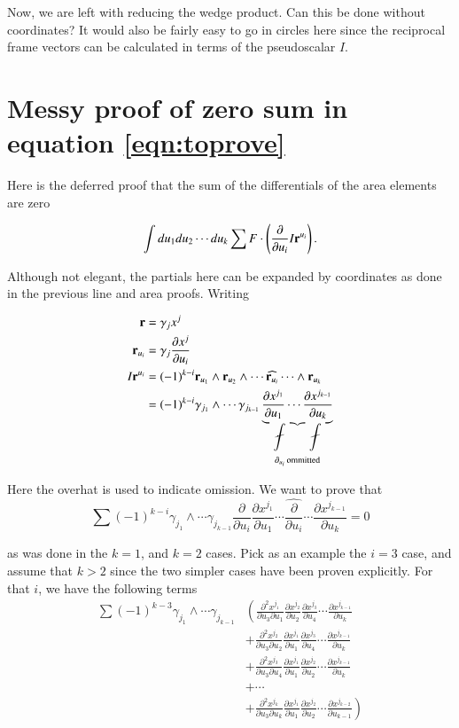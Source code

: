 \documentclass{article}
\newcommand{\PD}[2]{\frac{\partial {#2}}{\partial {#1}}}
\newcommand{\PDD}[3]{\frac{\partial^2 {#3}}{\partial {#1}\partial {#2}}}
\begin{document}
Now, we are left with reducing the wedge product.  Can this be done without coordinates?  It would also be fairly easy to go in circles here since the reciprocal frame vectors can be calculated in terms of the pseudoscalar $I$.

\section{ Messy proof of zero sum in equation \ref{eqn:toprove} }

Here is the deferred proof that the sum of the differentials of the area elements are zero

\begin{align*}
\int du_1 du_2 \cdots du_k \sum F \cdot \left( \PD{u_i}{} I \Br^{u_i} \right).
\end{align*}

Although not elegant, the partials here can be expanded by coordinates as done in the previous line and area proofs.
Writing

\begin{align*}
\Br &= \gamma_j x^j \\
\Br_{u_i} &= \gamma_j \PD{u_i}{x^j} \\
I \Br^{u_i}
&= (-1)^{k-i} \Br_{u_1} \wedge \Br_{u_2} \wedge \cdots \widehat{\Br_{u_i}} \cdots \wedge \Br_{u_k} \\
&= (-1)^{k-i} 
\gamma_{j_1} \wedge \cdots \gamma_{j_{k-1}} 
\underbrace{\PD{u_1}{x^{j_1}} \cdots \PD{u_k}{x^{j_{k-1}}}}_{\partial_{u_i} \,\text{ommitted} } \\
\end{align*}

Here the overhat is used to indicate omission.  We want to prove that 
\begin{equation}
\sum (-1)^{k-i} \gamma_{j_1} \wedge \cdots \gamma_{j_{k-1}} \PD{u_i}{} \PD{u_1}{x^{j_1}} \cdots \widehat{\PD{u_i}{}} \cdots \PD{u_k}{x^{j_{k-1}}} = 0
\end{equation}

as was done in the $k=1$, and $k=2$ cases.  Pick as an example the $i=3$ case, and assume that $k > 2$ since
the two simpler cases have been proven explicitly.  For that $i$, we have the following terms
\begin{align*}
\sum (-1)^{k-3} \gamma_{j_1} \wedge \cdots \gamma_{j_{k-1}} 
&\left(\PDD{u_3}{u_1}{x^{j_1}} \PD{u_2}{x^{j_{2}}} \PD{u_4}{x^{j_3}} \cdots \PD{u_k}{x^{j_{k-1}}}\right. \\
&+\PDD{u_3}{u_2}{x^{j_2}} \PD{u_1}{x^{j_1}} \PD{u_4}{x^{j_3}} \cdots \PD{u_k}{x^{j_{k-1}}} \\
&+\PDD{u_3}{u_4}{x^{j_3}} \PD{u_1}{x^{j_1}} \PD{u_2}{x^{j_2}} \cdots \PD{u_k}{x^{j_{k-1}}} \\
&+\cdots \\
&+\left.\PDD{u_3}{u_k}{x^{j_k}} \PD{u_1}{x^{j_1}} \PD{u_2}{x^{j_2}} \cdots \PD{u_{k-1}}{x^{j_{k-2}}}\right)
\end{align*}
\end{document}
